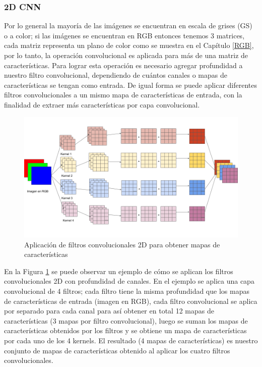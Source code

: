\begin{onehalfspacing}
\subsubsection{2D CNN}
\label{2DCNN}

Por lo general la mayoría de las imágenes se encuentran en escala de grises (GS) o a color; si las imágenes se encuentran en RGB entonces tenemos 3 matrices, cada matriz representa un plano de color como se muestra en el Capítulo \ref{RGB}, por lo tanto, la operación convolucional es aplicada para más de una matriz de características. Para lograr esta operación es necesario agregar profundidad a nuestro filtro convolucional, dependiendo de cuántos canales o mapas de características se tengan como entrada. De igual forma se puede aplicar diferentes filtros convolucionales a un mismo mapa de características de entrada, con la finalidad de extraer más características por capa convolucional.\\

\begin{figure}[th]
	\centering
	\includegraphics[width=16cm,keepaspectratio]{XX_Figures/Fig_Mapa_caracteristicas.png}
	\caption{\footnotesize Aplicación de filtros convolucionales 2D para obtener mapas de características}
	\label{fig:Fig_Mapa_caracteristicas}
\end{figure}

En la Figura \ref{fig:Fig_Mapa_caracteristicas} se puede observar un ejemplo de cómo se aplican los filtros convolucionales 2D con profundidad de canales. En el ejemplo se aplica una capa convolucional de 4 filtros; cada filtro tiene la misma profundidad que los mapas de características de entrada (imagen en RGB), cada filtro convolucional se aplica por separado para cada canal para así obtener en total 12 mapas de características (3 mapas por filtro convolucional), luego se suman los mapas de características obtenidos por los filtros y se obtiene un mapa de características por cada uno de los 4 kernels. El resultado (4 mapas de características) es nuestro conjunto de mapas de características obtenido al aplicar los cuatro filtros convolucionales.\\


\end{onehalfspacing}

